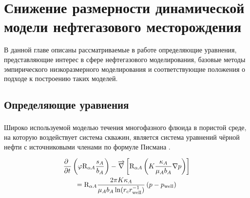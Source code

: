 \chapter{Снижение размерности динамической модели нефтегазового месторождения}\label{ch:ch2}




\newcommand{\bvec}[1]{\mathbf{#1}}
\newcommand{\resid}{\bvec{r}}
\newcommand{\unk}{\bvec{u}}
\newcommand{\jac}{\mathrm{J}}
\newcommand{\dunk}{\Delta \unk}
\newcommand{\vunk}{\bvec{v}}
\newcommand{\matr}[1]{\mathrm{\uppercase{#1}}}
\newcommand{\norm}[2][~]{\left\| #2  \right\|_{#1}}
\newcommand{\transpose}[1]{\matr{#1}^\mathrm{T}}
\newcommand{\dvunk}{\Delta \vunk}
\newcommand{\deriv}[3][]{\frac{\partial^{#1} #2}{\partial #3^{#1}}}
\newcommand{\pc}[1][~]{\bvec{\varphi}_{#1}}
\newcommand{\param}{\bvec{\mu}}
\newcommand{\nlin}{\bvec{\eta}}

В данной главе описаны рассматриваемые в работе определяющие уравнения, представляющие интерес в сфере нефтегазового моделирования, базовые методы эмпирического низкоразмерного моделирования и соответствующие положения о подходе к построению таких моделей.

\section{Определяющие уравнения}

\subsection{}

Широко используемой моделью течения многофазного флюида в пористой среде, на которую воздействует система скважин, является система уравнений чёрной нефти  с источниковыми членами по формуле Писмана \todo{\cite{}}.

\begin{multline}
    \label{eq:blackoil}
    \deriv{~}{t}\left(
        \varphi \matr{R}_{\alpha A} \frac{s_A}{b_A}
    \right) - \overrightarrow{\nabla} \left[
        \matr{R}_{\alpha A} \left(
            K\frac{\kappa_A}{\mu_A b_A}\nabla p
        \right)
    \right] \\
    = \matr{R}_{\alpha A}
    \frac{2\pi K \kappa_A}{\mu_A b_A \ln(r_c r_\text{well}^{-1})}
    \left(p - p_\text{well}\right)
\end{multline}

